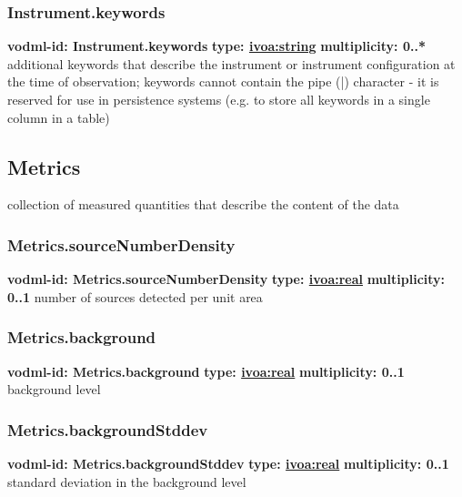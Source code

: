     \subsubsection{Instrument.keywords}
      \textbf{vodml-id: Instrument.keywords} \newline
      \textbf{type: \hyperref[sect:ivoa]{ivoa:string}} \newline
      \textbf{multiplicity: 0..*} \newline
      additional keywords that describe the instrument or instrument configuration at the time of observation; keywords cannot contain the pipe (|) character - it is reserved for use in persistence systems (e.g. to store all keywords in a single column in a table)

  \subsection{Metrics}
  \label{sect:Metrics}
    collection of measured quantities that describe the content of the data

    \subsubsection{Metrics.sourceNumberDensity}
      \textbf{vodml-id: Metrics.sourceNumberDensity} \newline
      \textbf{type: \hyperref[sect:ivoa]{ivoa:real}} \newline
      \textbf{multiplicity: 0..1} \newline
      number of sources detected per unit area

    \subsubsection{Metrics.background}
      \textbf{vodml-id: Metrics.background} \newline
      \textbf{type: \hyperref[sect:ivoa]{ivoa:real}} \newline
      \textbf{multiplicity: 0..1} \newline
      background level

    \subsubsection{Metrics.backgroundStddev}
      \textbf{vodml-id: Metrics.backgroundStddev} \newline
      \textbf{type: \hyperref[sect:ivoa]{ivoa:real}} \newline
      \textbf{multiplicity: 0..1} \newline
      standard deviation in the background level

